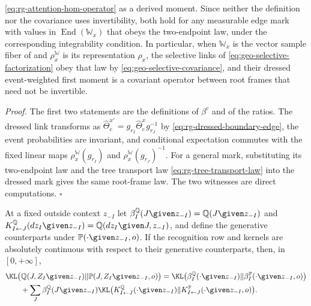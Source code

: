 \eqref{eq:rg-attention-hom-operator} as a derived moment. Since neither the
definition nor the covariance uses invertibility, both hold for any measurable edge
mark with values in $\operatorname{End}(\mathbb W_x)$ that obeys the two-endpoint law, under
the corresponding integrability condition. In particular, when $\mathbb W_x$ is the
vector sample fiber of  and $\rho^{\mathbb W}_x$ is its
representation $\rho_x$,
the selective links of \eqref{eq:geo-selective-factorization} obey that law by
\eqref{eq:geo-selective-covariance}, and their dressed event-weighted first moment is
a covariant operator between root frames that need not be invertible.

\noindent\emph{Proof.}
The first two statements are the definitions of $\beta^c$ and of the ratios. The
dressed link transforms as $\widehat\Theta^{x\prime}_e=g_{r_I}\widehat\Theta^x_eg_{r_J}^{-1}$
by \eqref{eq:rg-dressed-boundary-edge}, the event probabilities are invariant, and
conditional expectation commutes with the fixed linear maps $\rho^{\mathbb W}_x(g_{r_I})$ and
$\rho^{\mathbb W}_x(g_{r_J})^{-1}$. For a general mark, substituting its two-endpoint law and the tree
transport law \eqref{eq:rg-tree-transport-law} into the dressed mark gives the same
root-frame law. The two witnesses are direct computations. $\square$

At a fixed outside context $z_{-I}$ let
$\beta^{\mathbb Q}_I(J\given z_{-I})=\mathbb Q(J\given z_{-I})$ and
$K^{\mathbb Q}_{I\leftarrow J}(dz_I\given z_{-I})=\mathbb Q(dz_I\given J,z_{-I})$, and
define the generative counterparts under $\mathbb P(\cdot\given z_{-I},o)$. If the
recognition row and kernels are absolutely continuous with respect to their
generative counterparts, then, in $[0,+\infty]$,
\begin{equation}
\begin{aligned}
&\KL\bigl(\mathbb Q(J,Z_I\given z_{-I})\Vert\mathbb P(J,Z_I\given z_{-I},o)\bigr)
=\KL\bigl(\beta^{\mathbb Q}_I(\cdot\given z_{-I})\Vert\beta^{\mathbb P}_I(\cdot\given z_{-I},o)\bigr)\\
&\qquad+\sum_J\beta^{\mathbb Q}_I(J\given z_{-I})
\KL\bigl(K^{\mathbb Q}_{I\leftarrow J}(\cdot\given z_{-I})\Vert K^{\mathbb P}_{I\leftarrow J}(\cdot\given z_{-I},o)\bigr).
\end{aligned}
\label{eq:rg-meta-attention-kl-split}
\end{equation}

